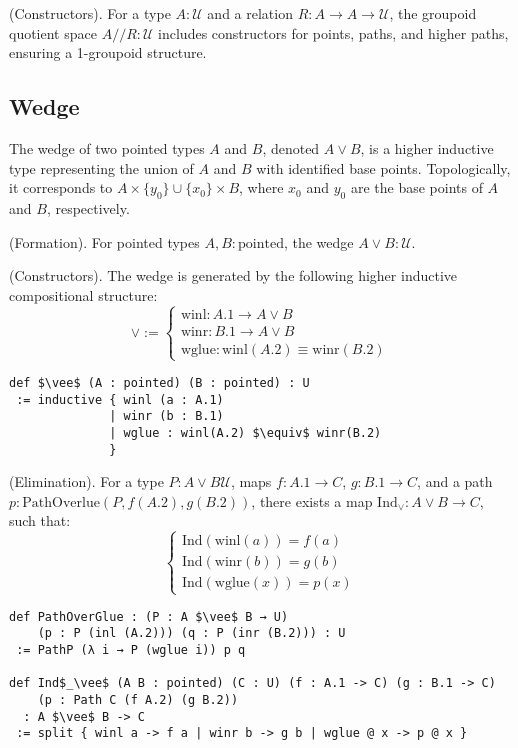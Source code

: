 \begin{definition} (Constructors).
For a type \( A : \mathcal{U} \) and a relation \( R : A \to A \to \mathcal{U} \),
the groupoid quotient space \( A // R : \mathcal{U} \) includes
constructors for points, paths, and higher paths, ensuring a 1-groupoid structure.
\end{definition}

\newpage
\subsection{Wedge}
The wedge of two pointed types \( A \) and \( B \), denoted \( A \vee B \),
is a higher inductive type representing the union of \( A \)
and \( B \) with identified base points. Topologically,
it corresponds to \( A \times \{ y_0 \} \cup \{ x_0 \} \times B \),
where \( x_0 \) and \( y_0 \) are the base points of \( A \) and \( B \), respectively.

\begin{definition} (Formation).
For pointed types \( A, B : \text{pointed} \), the wedge \( A \vee B : \mathcal{U} \).
\end{definition}

\begin{definition} (Constructors).
The wedge is generated by the following higher inductive compositional structure:
\[
\vee :=
\begin{cases}
\text{winl} : A.1 \to A \vee B \\
\text{winr} : B.1 \to A \vee B \\
\text{wglue} : \text{winl} (A.2) \equiv \text{winr}(B.2)
\end{cases}
\]
\begin{lstlisting}[mathescape=true]
def $\vee$ (A : pointed) (B : pointed) : U
 := inductive { winl (a : A.1)
              | winr (b : B.1)
              | wglue : winl(A.2) $\equiv$ winr(B.2)
              }
\end{lstlisting}
\end{definition}

\begin{theorem} (Elimination).
For a type \( P : A \vee B \mathcal{U} \), maps \( f : A.1 \to C \),
\( g : B.1 \to C \), and a path \( p : \text{PathOverlue}(P,f(A.2),g (B.2)) \),
there exists a map \( \text{Ind}_\vee : A \vee B \to C \), such that:
\[
\begin{cases}
\text{Ind}(\text{winl}(a)) = f(a) \\
\text{Ind}(\text{winr}(b)) = g(b) \\
\text{Ind}(\text{wglue}(x)) = p(x)
\end{cases}
\]
\begin{lstlisting}[mathescape=true]
def PathOverGlue : (P : A $\vee$ B → U)
    (p : P (inl (A.2))) (q : P (inr (B.2))) : U
 := PathP (λ i → P (wglue i)) p q

def Ind$_\vee$ (A B : pointed) (C : U) (f : A.1 -> C) (g : B.1 -> C)
    (p : Path C (f A.2) (g B.2))
  : A $\vee$ B -> C
 := split { winl a -> f a | winr b -> g b | wglue @ x -> p @ x }
\end{lstlisting}
\end{theorem}

